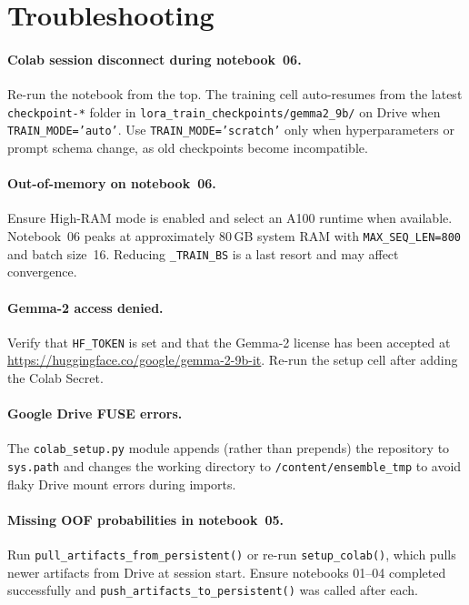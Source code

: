 \documentclass[11pt,a4paper]{article}
\newcommand{\repo}[1]{\texttt{#1}}
\begin{document}
\section{Troubleshooting}
\label{sec:troubleshooting}

\paragraph{Colab session disconnect during notebook~06.}
Re-run the notebook from the top. The training cell auto-resumes from the latest \texttt{checkpoint-*} folder in \repo{lora\_train\_checkpoints/gemma2\_9b/} on Drive when \texttt{TRAIN\_MODE='auto'}. Use \texttt{TRAIN\_MODE='scratch'} only when hyperparameters or prompt schema change, as old checkpoints become incompatible.

\paragraph{Out-of-memory on notebook~06.}
Ensure High-RAM mode is enabled and select an A100 runtime when available. Notebook~06 peaks at approximately 80\,GB system RAM with \texttt{MAX\_SEQ\_LEN=800} and batch size~16. Reducing \texttt{\_TRAIN\_BS} is a last resort and may affect convergence.

\paragraph{Gemma-2 access denied.}
Verify that \texttt{HF\_TOKEN} is set and that the Gemma-2 license has been accepted at \url{https://huggingface.co/google/gemma-2-9b-it}. Re-run the setup cell after adding the Colab Secret.

\paragraph{Google Drive FUSE errors.}
The \repo{colab\_setup.py} module appends (rather than prepends) the repository to \texttt{sys.path} and changes the working directory to \repo{/content/ensemble\_tmp} to avoid flaky Drive mount errors during imports.

\paragraph{Missing OOF probabilities in notebook~05.}
Run \repo{pull\_artifacts\_from\_persistent()} or re-run \repo{setup\_colab()}, which pulls newer artifacts from Drive at session start. Ensure notebooks 01--04 completed successfully and \repo{push\_artifacts\_to\_persistent()} was called after each.
\end{document}
